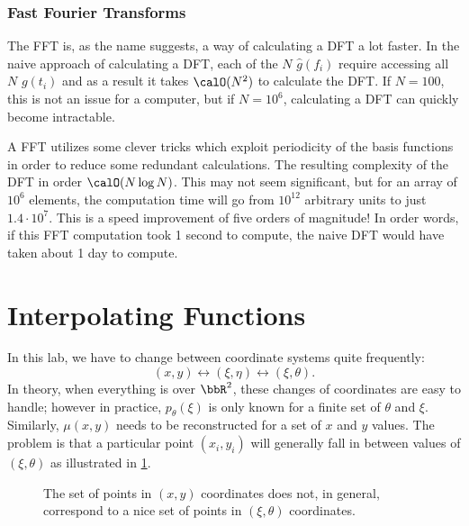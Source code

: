 \documentclass[
  a4paper,             %
  11pt,                %
  oneside,             %
  onecolumn,           %
  bibliography=totoc,  %
  final,               %
]{scrartcl}
\begin{document}
\subsubsection{Fast Fourier Transforms}
\label{subsubsec:fast_fourier_transforms}

The \gls{FFT} is, as the name suggests, a way of calculating a \gls{DFT} a lot
faster.  In the naive approach of calculating a \gls{DFT}, each of the \(N\)
\(\hat g(f_{i})\) require accessing all \(N\) \(g(t_{i})\) and as a result it
takes \(\calO(N^{2})\) to calculate the \gls{DFT}.  If \(N = 100\), this is not
an issue for a computer, but if \(N = 10^{6}\), calculating a \gls{DFT} can
quickly become intractable.

A \gls{FFT} utilizes some clever tricks which exploit periodicity of the basis
functions in order to reduce some redundant calculations.  The resulting
complexity of the \gls{DFT} in order \(\calO(N \log N)\).  This may not seem
significant, but for an array of \(10^{6}\) elements, the computation time will
go from \(10^{12}\) arbitrary units to just \(1.4 \cdot 10^{7}\).  This is a
speed improvement of five orders of magnitude!  In order words, if this
\gls{FFT} computation took 1 second to compute, the naive \gls{DFT} would have
taken about 1 day to compute.

\section{Interpolating Functions}
\label{sec:interpolating_functions}

In this lab, we have to change between coordinate systems quite frequently:
\begin{equation}
  (x, y) \leftrightarrow (\xi, \eta) \leftrightarrow (\xi, \theta).
\end{equation}
In theory, when everything is over \(\bbR^{2}\), these changes of coordinates
are easy to handle; however in practice, \(p_{\theta}(\xi)\) is only known for a
finite set of \(\theta\) and \(\xi\).  Similarly, \(\mu(x, y)\) needs to be
reconstructed for a set of \(x\) and \(y\) values.  The problem is that a
particular point \((x_{i}, y_{i})\) will generally fall in between values of
\((\xi, \theta)\) as illustrated in \cref{fig:interpolation}.

\begin{figure}
  \centering
  \caption{The set of points in \((x, y)\) coordinates does not, in general,
    correspond to a nice set of points in \((\xi, \theta)\) coordinates.}
  \label{fig:interpolation}
\end{figure}
\end{document}
